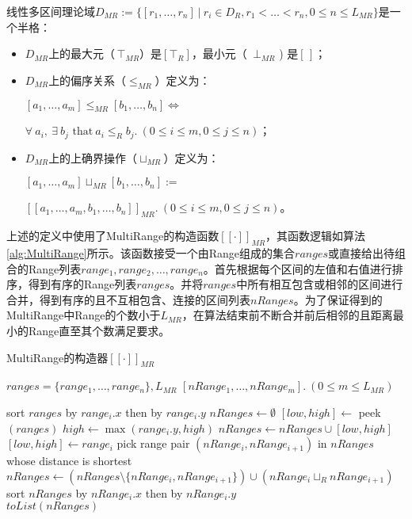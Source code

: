 \begin{definition}
	线性多区间理论域$ D_{MR}  := \{ [r_1, \dots, r_n] \ | \ r_i \in D_R,  r_1 < \dots < r_n, 0 \le n \le L_{MR} \}$是一个半格：
	\begin{itemize}
		\item $ D_{MR} $上的最大元（$\, \top_{MR} $）是$ [\top_R] $，最小元（\, $ \bot_{MR} $ ) 是$ [\,] $；
		
		\item $ D_{MR} $上的偏序关系（$ \le_{MR} $）定义为：\\
			\centerline{$[a_1, \dots, a_m] \le_{MR} [b_1, \dots, b_n] \iff$}
			\centerline{$ \forall \ a_i, \ \exists\  b_j \text{ that} \ a_i \le_R b_j .\  (0 \le i \le m, 0 \le j \le n)$；}
			
		\item $ D_{MR} $上的上确界操作（$ \sqcup_{MR} $）定义为：\\
			\centerline{$ [a_1, \dots, a_m] \sqcup_{MR} [b_1, \dots, b_n]  := $}
			\centerline{$ [[a_1, \dots, a_m, b_1, \dots, b_n]]_{MR} .\  (0 \le i \le m, 0 \le j \le n)$。}
	\end{itemize}
	
\end{definition}

上述的定义中使用了MultiRange的构造函数$ [[\cdot]]_{MR} $，其函数逻辑如算法\ref{alg:MultiRange}所示。该函数接受一个由Range组成的集合$ ranges $或直接给出待组合的Range列表$ range_1, range_2, \dots, range_n $。首先根据每个区间的左值和右值进行排序，得到有序的Range列表$ ranges $。并将$ ranges $中所有相互包含或相邻的区间进行合并，得到有序的且不互相包含、连接的区间列表$ nRanges $。为了保证得到的MultiRange中Range的个数小于$ L_{MR} $，在算法结束前不断合并前后相邻的且距离最小的Range直至其个数满足要求。

\begin{breakablealgorithm}
	\caption{MultiRange的构造器$ [[\cdot]]_{MR} $}
	\label{alg:MultiRange}
	\begin{algorithmic}[1]
		
		\Require $ ranges = \{range_1, \dots, range_n\}, L_{MR} $
		\Ensure $ [nRange_1, \dots, nRange_m]. \ (0 \le m \le L_{MR})$
		
		\State sort $ ranges $ by $ range_{i}.x $ then by $ range_{i}.y $
		\State $ nRanges \gets \emptyset$
		\State $ [low, high] \gets$ peek$ (ranges) $
				\State $ high \gets \max(range_i.y, high) $
			\Else
				\State $ nRanges \gets nRanges \cup [low, high] $
				\State $ [low, high] \gets range_i $
			\EndIf
		\EndFor
			\State pick range pair $ (nRange_i, nRange_{i+1} )$ in $ nRanges $ whose distance is shortest
			\State $ nRanges \gets (nRanges \setminus\{nRange_i, nRange_{i+1}\}) \cup (nRange_i \sqcup_R nRange_{i+1}) $
			\State sort $ nRanges $ by $ nRange_{i}.x $ then by $ nRange_{i}.y $
		\EndWhile
		\\\Return $ toList(nRanges) $
		
	\end{algorithmic}
\end{breakablealgorithm}

